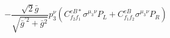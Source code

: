 %
\begin{dmath*}
%
  -  \frac{\sqrt{2} {\bar g}{}}{\sqrt{{\bar g}^{\prime 2} + {\bar g}{}^2}}p_3^{\nu} \left(C^{eB*}_{f_2 f_1} \sigma^{\mu_3 \nu } P_L  + C^{eB}_{f_1 f_2} \sigma^{\mu_3 \nu } P_R \right)
%
\end{dmath*}
%
